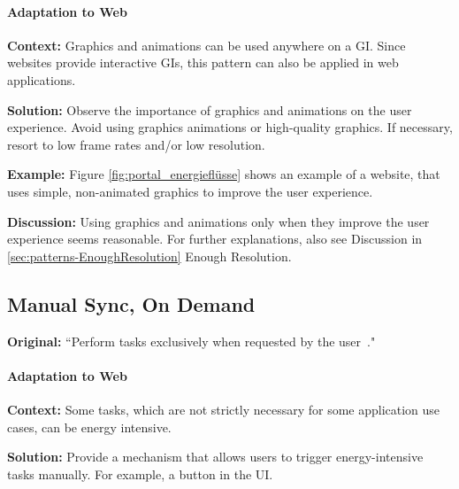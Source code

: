 \paragraph{Adaptation to Web}\mbox{}

\textbf{Context:} Graphics and animations can be used anywhere on a GI. Since websites provide interactive GIs, this pattern can also be applied in web applications.

\textbf{Solution:} Observe the importance of graphics and animations on the user experience. Avoid using graphics animations or high-quality graphics. If necessary, resort to low frame rates and/or low resolution.

\textbf{Example:} Figure \ref{fig:portal_energieflüsse} shows an example of a website, that uses simple, non-animated graphics to improve the user experience.

 

\textbf{Discussion:} Using graphics and animations only when they improve the user experience seems reasonable. For further explanations, also see Discussion in \ref{sec:patterns-EnoughResolution} Enough Resolution.


\subsection{Manual Sync, On Demand} \label{sec:patterns-ManualSyncOnDemand}
\textbf{Original:} ``Perform tasks exclusively when requested by the user~\cite{cruz2019catalog}."

\paragraph{Adaptation to Web}\mbox{}

\textbf{Context:} Some tasks, which are not strictly necessary for some application use cases, can be energy intensive.

\textbf{Solution:} Provide a mechanism that allows users to trigger energy-intensive tasks manually. For example, a button in the UI.

